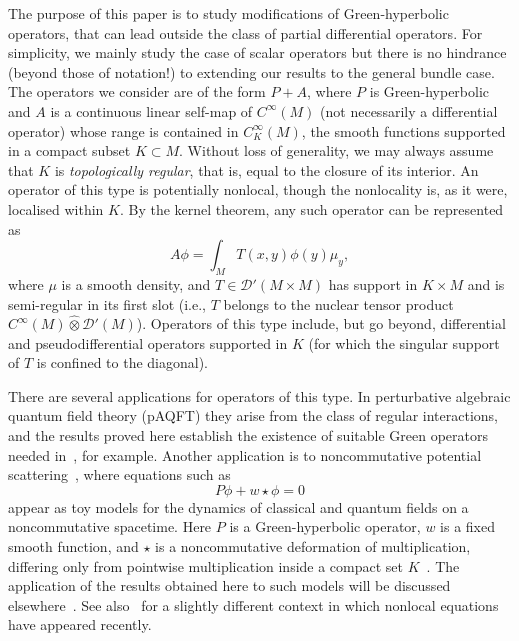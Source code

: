 \documentclass[pdftex]{sigma}
\numberwithin{equation}{section}
\newcommand{\DD}{{\mathscr D}}
\begin{document}
 The purpose of this paper is to study modifications of Green-hyperbolic operators, that can lead outside the class of partial differential operators. For simplicity, we mainly study the case of scalar operators but there is no hindrance (beyond those of notation!) to extending our results to the general bundle case. The operators we consider are of the form $P+A$, where $P$ is Green-hyperbolic and $A$ is a continuous linear self-map of $C^\infty(M)$ (not necessarily a differential operator) whose range is contained in $C^\infty_K(M)$, the smooth functions supported in a compact subset $K\subset M$. Without loss of generality, we may always assume that $K$ is \emph{topologically regular}, that is, equal to the closure of its interior.
 An operator of this type is potentially nonlocal, though the nonlocality is, as it were, localised within $K$. By the kernel theorem, any such operator can be represented as
 \begin{equation*}
 	A\phi = \int_M T(x,y)\phi(y)\mu_y,
 \end{equation*}
 where $\mu$ is a smooth density, and $T\in \DD'(M\times M)$ has support in $K\times M$ and is semi-regular in its first slot
 \big(i.e., $T$ belongs to the nuclear tensor product $C^\infty(M)\widehat{\otimes} \DD'(M)$\big). Operators of this type include, but go beyond, differential and pseudodifferential operators supported in $K$ (for which the singular support of $T$ is confined
 to the diagonal).

 There are several applications for operators of this type. In perturbative algebraic quantum field theory (pAQFT) they arise from the class of regular interactions, and the results proved here establish the existence of suitable Green operators needed in~\cite{HawRej:2020}, for example. Another application is to noncommutative potential scattering~\cite{LechnerVerch:2015}, where equations such as
 \begin{equation*}
 	P \phi + w\star \phi = 0
 \end{equation*}
 appear as toy models for the dynamics of classical and quantum fields on a noncommutative spacetime. Here $P$ is a Green-hyperbolic operator, $w$ is a fixed smooth function, and $\star$ is a noncommutative deformation
 of multiplication, differing only from pointwise multiplication inside a compact set $K$~\cite{LechnerWaldmann:2016}. The application of the results obtained here to such models will be discussed elsewhere~\cite{FewVer:20xxb}. See also~\cite{DappiaggiFinster:2020} for a slightly different context in which
 nonlocal equations have appeared recently.
\end{document}
